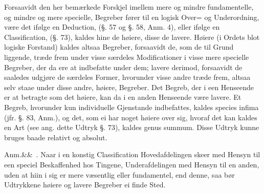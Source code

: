 \documentclass[12pt]{book}
\def\sperr#1{#1}%
\def\textit#1{#1}%
\def\emph#1{#1}%
\newcommand{\sperr}[1]{\textls[180]{#1}}
\newcommand{\anm}[1]{%
  \par\vspace{0.5\baselineskip}%
  \noindent\hspace{\parindent}\sperr{Anm.}\ifx&#1&\else~\textit{#1}.\fi
  \enspace\ignorespaces
}
\newcommand{\opage}[1]{\marginnote{\footnotesize\textit{[#1]}}}
\begin{document}
Forsaavidt den her bemærkede Forskjel imellem mere og mindre fundamentelle, og mindre
og mere specielle, Begreber fører til en logisk
\opage{243}Over= og Underordning, være det ifølge en Deduction, (§. 57 og §. 58, Anm. 4), eller
ifølge en Classification, (§. 73), kaldes hine de \emph{høiere}, disse de
\emph{lavere}. Høiere (i Ordets blot logiske Forstand) kaldes altsaa Begreber,
forsaavidt de, som de til Grund liggende, træde frem under visse særdeles
Modificationer i visse mere specielle Begreber, der da ere at indbefatte under dem;
lavere derimod, forsaavidt de saaledes udgjøre de særdeles Former, hvorunder visse
andre træde frem, altsaa selv staae under disse andre, høiere, Begreber. Det Begreb,
der i een Henseende er at betragte som det høiere, kan da i en anden Henseende være
lavere. Et Begreb, hvorunder kun individuelle Gjenstande indbefattes, kaldes
\textit{species infima} (jfr. §. 83, Anm.), og det, som ei har noget høiere over sig,
hvoraf det kan kaldes en Art (see ang. dette Udtryk §. 73), kaldes
\textit{genus summum}. Disse Udtryk kunne bruges baade relativt og absolut.

\anm{} Naar i en konstig Classification Hovedafdelingen skeer med Hensyn til een
speciel Beskaffenhed hos Tingene, Underafdelingen med Hensyn til en anden, uden at hiin
i sig er mere væsentlig eller fundamentel, end denne, saa bør Udtrykkene \emph{høiere
og lavere} Begreber ei finde Sted.
\end{document}
